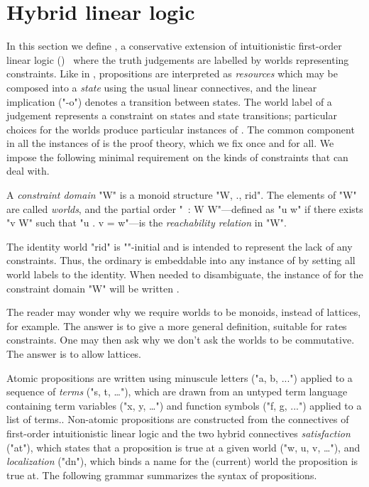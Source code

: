 \documentclass{article}
\begin{document}
\section{Hybrid linear logic}
\label{sec:hyll}

In this section we define \hyll, a conservative extension of intuitionistic
first-order linear logic (\ill)~\cite{girard87tcs} where the truth judgements
are labelled by worlds representing constraints. Like in \ill, propositions are
interpreted as \emph{resources} which may be composed into a \emph{state} using
the usual linear connectives, and the linear implication ("-o") denotes a
transition between states. The world label of a judgement represents a
constraint on states and state transitions; particular choices for the worlds
produce particular instances of \hyll. The common component in all the instances
of \hyll is the proof theory, which we fix once and for all. We impose the
following minimal requirement on the kinds of constraints that \hyll can deal
with.

\begin{defn} \label{defn:constraint-domain}
A \emph{constraint domain} "\cal W" is a monoid structure
  "\langle W, ., rid\rangle". The elements of "W" are called \emph{worlds}, and
  the partial order "\preceq\ : W \times W"---defined as "u \preceq w" if there
  exists "v \in W" such that "u . v = w"---is the \emph{reachability relation}
  in "\cal W".
\end{defn}

\noindent
The identity world "rid" is "\preceq"-initial and is intended to represent the
lack of any constraints. Thus, the ordinary \ill is embeddable into any instance
of \hyll by setting all world labels to the identity. When needed to
disambiguate, the instance of \hyll for the constraint domain "\cal W" will be
written \chyll[W].

The reader may wonder why we require worlds to be monoids, instead of lattices, for example.
The answer is to give a more general definition, suitable for rates constraints. 
One may then ask why we don't ask the worlds to be commutative. The answer is to allow 
lattices.

Atomic propositions are written using minuscule letters ("a, b, ...") applied to
a sequence of \emph{terms} ("s, t, \ldots"), which are drawn from an untyped
term language containing term variables ("x, y, \ldots") and function symbols
("f, g, ...") applied to a list of terms.. Non-atomic propositions are
constructed from the connectives of first-order intuitionistic linear logic and
the two hybrid connectives \emph{satisfaction} ("at"), which states that a
proposition is true at a given world ("w, u, v, \ldots"), and
\emph{localization} ("dn"), which binds a name for the (current) world the proposition is
true at. The following grammar summarizes the syntax of \hyll propositions.
\end{document}
